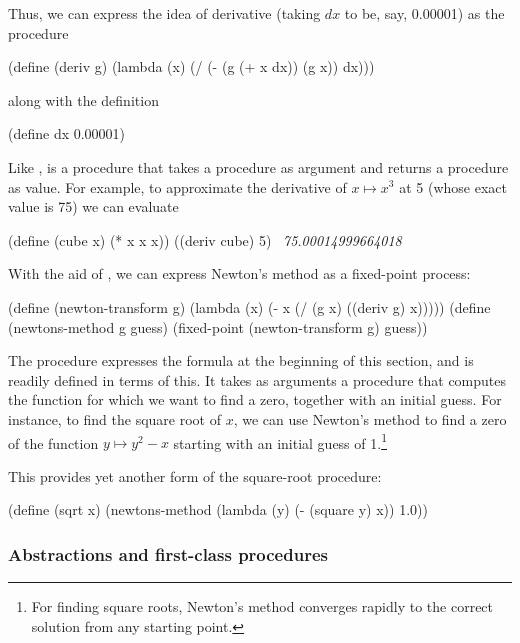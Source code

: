 \noindent
Thus, we can express the idea of derivative (taking \( dx \) to be, say,
0.00001) as the procedure

\begin{codeBlock}
(define (deriv g)
  (lambda (x) (/ (- (g (+ x dx)) (g x)) dx)))
\end{codeBlock}

\noindent
along with the definition

\begin{codeBlock}
(define dx 0.00001)
\end{codeBlock}

\noindent
Like ,  is a procedure that takes a procedure as
argument and returns a procedure as value.  For example, to approximate the
derivative of \( x \mapsto x^3 \) at 5 (whose exact value is 75) we can evaluate

\begin{codeBlock}
(define (cube x) (* x x x))
((deriv cube) 5)
~\textit{75.00014999664018}~
\end{codeBlock}

\noindent
With the aid of , we can express Newton's method as a fixed-point
process:

\begin{codeBlock}
(define (newton-transform g)
  (lambda (x) (- x (/ (g x) ((deriv g) x)))))
(define (newtons-method g guess)
  (fixed-point (newton-transform g) guess))
\end{codeBlock}

\noindent
The  procedure expresses the formula at the beginning of
this section, and  is readily defined in terms of this.
It takes as arguments a procedure that computes the function for which we want
to find a zero, together with an initial guess.  For instance, to find the
square root of \( x \), we can use Newton's method to find a zero of the function
\( y \mapsto y^2 - x \) starting with an initial guess of 1.\footnote{For
finding square roots, Newton's method converges rapidly to the correct solution
from any starting point.}

This provides yet another form of the square-root procedure:

\begin{codeBlock}
(define (sqrt x)
  (newtons-method
   (lambda (y) (- (square y) x)) 1.0))
\end{codeBlock}

\subsubsection*{Abstractions and first-class procedures}

